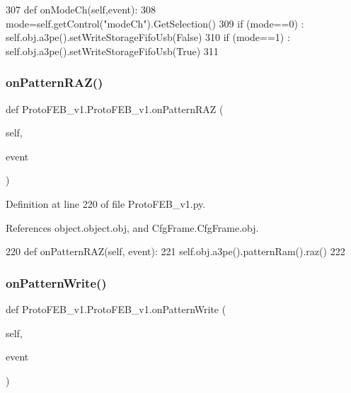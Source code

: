 \begin{DoxyCode}
307     \textcolor{keyword}{def }onModeCh(self,event):
308         mode=self.getControl(\textcolor{stringliteral}{"modeCh"}).GetSelection()
309         \textcolor{keywordflow}{if} (mode==0) : self.obj.a3pe().setWriteStorageFifoUsb(\textcolor{keyword}{False})
310         \textcolor{keywordflow}{if} (mode==1) : self.obj.a3pe().setWriteStorageFifoUsb(\textcolor{keyword}{True})
311 
\end{DoxyCode}
\mbox{\label{classProtoFEB__v1_1_1ProtoFEB__v1_a7f49aab9779b34272906afef8df9f6d7}} 
\subsubsection{\texorpdfstring{on\+Pattern\+R\+A\+Z()}{onPatternRAZ()}}
{\footnotesize\ttfamily def Proto\+F\+E\+B\+\_\+v1.\+Proto\+F\+E\+B\+\_\+v1.\+on\+Pattern\+R\+AZ (\begin{DoxyParamCaption}\item[{}]{self,  }\item[{}]{event }\end{DoxyParamCaption})}



Definition at line 220 of file Proto\+F\+E\+B\+\_\+v1.\+py.



References object.\+object.\+obj, and Cfg\+Frame.\+Cfg\+Frame.\+obj.


\begin{DoxyCode}
220     \textcolor{keyword}{def }onPatternRAZ(self, event):
221         self.obj.a3pe().patternRam().raz()
222 
\end{DoxyCode}
\mbox{\label{classProtoFEB__v1_1_1ProtoFEB__v1_a33df4a0a6bcdd022dd1ff67e57b6d1a4}} 
\subsubsection{\texorpdfstring{on\+Pattern\+Write()}{onPatternWrite()}}
{\footnotesize\ttfamily def Proto\+F\+E\+B\+\_\+v1.\+Proto\+F\+E\+B\+\_\+v1.\+on\+Pattern\+Write (\begin{DoxyParamCaption}\item[{}]{self,  }\item[{}]{event }\end{DoxyParamCaption})}



